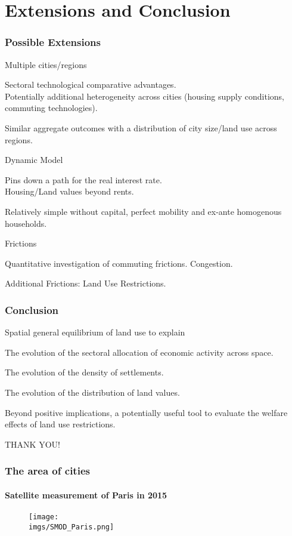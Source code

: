 \documentclass[aspectratio=169]{beamer}
\begin{document}
\section{Extensions and Conclusion}
\begin{frame}
\frametitle{Possible Extensions}
\bi
\item Multiple cities/regions
\bi\item Sectoral technological comparative advantages.\\ Potentially additional heterogeneity across cities (housing supply conditions, commuting technologies).
\item Similar aggregate outcomes with a distribution of city size/land use across regions.\ei
\bigskip
\item Dynamic Model
\bi\item Pins down a path for the real interest rate.\\
Housing/Land values beyond rents.
\item Relatively simple without capital, perfect mobility and ex-ante homogenous households.\ei
\bigskip
\item Frictions
\bi \item Quantitative investigation of commuting frictions. Congestion.
\item Additional Frictions: Land Use Restrictions. 
\ei
\ei
\end{frame}

\begin{frame}
\frametitle{Conclusion}

\bi
\item Spatial general equilibrium of land use to explain
\smallskip

\bi\item The evolution of the sectoral allocation of economic activity across space.
\smallskip
\item The evolution of the density of settlements.
\smallskip
\item The evolution of the distribution of land values.
\ei
\bigskip
\item Beyond positive implications, a potentially useful tool to evaluate the welfare effects of land use restrictions.\ei

\bigskip
\begin{center}
  THANK YOU!
\end{center}
\end{frame}

\beginbackup

\begin{frame}[label=SatParis]
\frametitle{The area of cities}
\framesubtitle{Satellite measurement of Paris in 2015}
\begin{figure}
	\begin{center}
	\texttt{[image: \\imgs/SMOD\_Paris.png]}
	\end{center}
\end{figure}
\hyperlink{AreaMeasure}{}\\
\end{frame}
\end{document}
